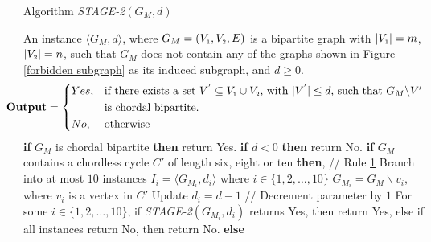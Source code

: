 \documentclass[review, 1p]{elsarticle}
\begin{document}
  \begin{algorithm}[h]
\caption{Algorithm  \textit{STAGE-2}$(G_{M},d)$\label{alg7}}
\begin{algorithmic}[1] 
 \Require An instance $\langle G_{M},d \rangle$, where $G_{M}=(V_{\mathsmaller 1}, V_{\mathsmaller 2}, E)$ is a bipartite graph with $\vert V_{\mathsmaller 1} \vert=m$, $\vert V_{\mathsmaller 2} \vert=n$, such that $G_{M}$ does not contain any of the graphs shown in Figure \ref{forbidden subgraph} as its induced subgraph, and $d \geq 0$. \vspace{-0.1 in} \[  \hspace{-0.23 in}\textbf{Output} = \begin{dcases*} Yes,  & if there exists a set $V^{'} \subseteq V_{\mathsmaller 1} \cup V_{\mathsmaller 2}$, with $\vert V^{'} \vert \leq d$, such that $G_{M} \backslash V'$  \\    
        &  is chordal bipartite.\\
   No,     & otherwise
\end{dcases*}
\]
\State \textbf{if} {$G_{M}$ is chordal bipartite} \textbf{then} return Yes. \vspace{-0.05 in}
 \State \textbf{if} {$d < 0$} \textbf{then} return No. \vspace{-0.05 in}
 \State \textbf{if} {$G_{M}$ contains a chordless cycle $C'$ of length six, eight or ten} \textbf{then}, // Rule \hyperref[presv]{1} \newline \vspace{-0.05 in}
  \indent Branch into at most $10$ instances $I_{i}=\langle G_{M_{i}}, d_{i}\rangle$ where $i \in \{1,2,\ldots,10\}$ \vspace{-0.03 in} \newline \vspace{-0.05 in} 
  \indent  $G_{M_{i}} = G_{M} \backslash v_{i}$, where $v_{i}$ is a vertex in $C'$ \newline   \vspace{-0.03 in}
 \indent Update $d_{i} = d-1$  \hspace{1.0 in} // Decrement parameter by $1$ \vspace{-0.05 in}  \newline \vspace{-0.03 in} 
\noindent For some $i \in \{1,2,\ldots,10\}$, if \textit{STAGE-2}$(G_{M_{i}},d_{i})$ returns Yes, then return Yes, else if all instances return No, then return No. \vspace{-0.08 in}
\State \textbf{else}\vspace{-0.08 in}

\end{algorithmic}
\end{algorithm}
\end{document}
